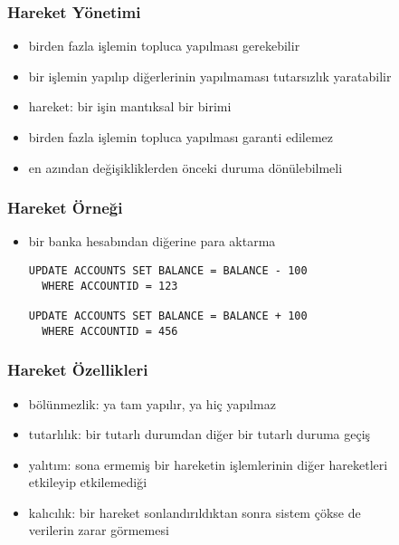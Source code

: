 \documentclass[dvipsnames]{beamer}
\theoremstyle{plain}
\begin{document}
\begin{frame}
  \frametitle{Hareket Yönetimi}

  \begin{itemize}
    \item birden fazla işlemin topluca yapılması gerekebilir
    \item bir işlemin yapılıp diğerlerinin yapılmaması tutarsızlık yaratabilir
    \item \alert{hareket}: bir işin mantıksal bir birimi

    \pause
    \medskip
    \item birden fazla işlemin topluca yapılması garanti edilemez
    \item en azından değişikliklerden önceki duruma dönülebilmeli
  \end{itemize}
\end{frame}

\begin{frame}[fragile]
  \frametitle{Hareket Örneği}

  \begin{itemize}
    \item bir banka hesabından diğerine para aktarma

    \medskip
    \begin{lstlisting}
UPDATE ACCOUNTS SET BALANCE = BALANCE - 100
  WHERE ACCOUNTID = 123

UPDATE ACCOUNTS SET BALANCE = BALANCE + 100
  WHERE ACCOUNTID = 456
    \end{lstlisting}
  \end{itemize}
\end{frame}

\begin{frame}
  \frametitle{Hareket Özellikleri}

  \begin{itemize}
    \item bölünmezlik: ya tam yapılır, ya hiç yapılmaz

    \pause
    \medskip
    \item tutarlılık: bir tutarlı durumdan diğer bir tutarlı duruma geçiş

    \pause
    \medskip
    \item yalıtım: sona ermemiş bir hareketin işlemlerinin diğer hareketleri\\
        etkileyip etkilemediği

    \pause
    \medskip
    \item kalıcılık: bir hareket sonlandırıldıktan sonra sistem çökse de\\
        verilerin zarar görmemesi
  \end{itemize}
\end{frame}
\end{document}
